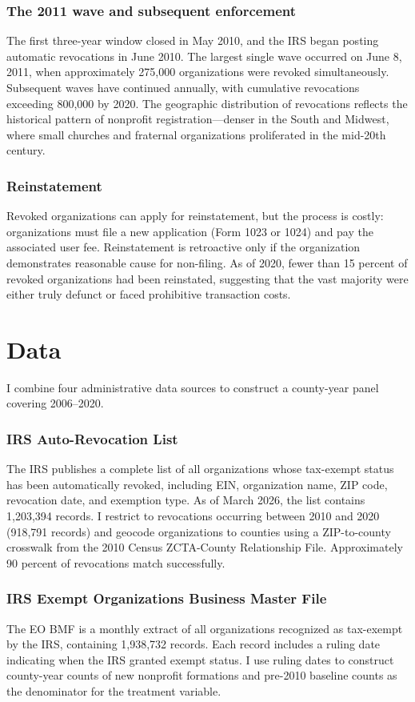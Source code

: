 \documentclass[12pt]{article}
\begin{document}
\subsubsection*{The 2011 wave and subsequent enforcement}
The first three-year window closed in May 2010, and the IRS began posting automatic revocations in June 2010. The largest single wave occurred on June 8, 2011, when approximately 275,000 organizations were revoked simultaneously. Subsequent waves have continued annually, with cumulative revocations exceeding 800,000 by 2020. The geographic distribution of revocations reflects the historical pattern of nonprofit registration---denser in the South and Midwest, where small churches and fraternal organizations proliferated in the mid-20th century.

\subsubsection*{Reinstatement}
Revoked organizations can apply for reinstatement, but the process is costly: organizations must file a new application (Form 1023 or 1024) and pay the associated user fee. Reinstatement is retroactive only if the organization demonstrates reasonable cause for non-filing. As of 2020, fewer than 15 percent of revoked organizations had been reinstated, suggesting that the vast majority were either truly defunct or faced prohibitive transaction costs.

\section{Data}

I combine four administrative data sources to construct a county-year panel covering 2006--2020.

\subsubsection*{IRS Auto-Revocation List}
The IRS publishes a complete list of all organizations whose tax-exempt status has been automatically revoked, including EIN, organization name, ZIP code, revocation date, and exemption type. As of March 2026, the list contains 1,203,394 records. I restrict to revocations occurring between 2010 and 2020 (918,791 records) and geocode organizations to counties using a ZIP-to-county crosswalk from the 2010 Census ZCTA-County Relationship File. Approximately 90 percent of revocations match successfully.

\subsubsection*{IRS Exempt Organizations Business Master File}
The EO BMF is a monthly extract of all organizations recognized as tax-exempt by the IRS, containing 1,938,732 records. Each record includes a ruling date indicating when the IRS granted exempt status. I use ruling dates to construct county-year counts of new nonprofit formations and pre-2010 baseline counts as the denominator for the treatment variable.
\end{document}

